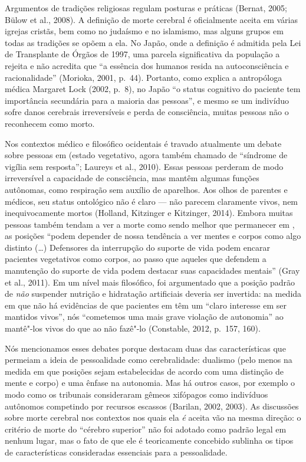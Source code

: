 Argumentos de tradições religiosas regulam posturas e práticas (Bernat,
2005; Bülow et al., 2008). A definição de morte cerebral é oficialmente
aceita em várias igrejas cristãs, bem como no judaísmo e no islamismo, mas
alguns grupos em todas as tradições se opõem a ela. No Japão, onde a
definição é admitida pela Lei de Transplante de Órgãos de 1997, uma
parcela significativa da população a rejeita e não acredita que ``a
essência dos humanos resida na autoconsciência e racionalidade''
(Morioka, 2001, p.~44). Portanto, como explica a antropóloga médica
Margaret Lock (2002, p.~8), no Japão ``o status cognitivo do paciente tem
importância secundária para a maioria das pessoas'', e mesmo se um
indivíduo sofre danos cerebrais irreversíveis e perda de consciência,
muitas pessoas não o reconhecem como morto.

Nos contextos médico e filosófico ocidentais é travado atualmente um
debate sobre pessoas em  (estado vegetativo, agora também chamado de
``síndrome de vigília sem resposta''; Laureys et al., 2010). Essas
pessoas perderam de modo irreversível a capacidade de consciência, mas
mantêm algumas funções autônomas, como respiração sem auxílio de
aparelhos. Aos olhos de parentes e médicos, seu status ontológico não é
claro --- não parecem claramente vivos, nem inequivocamente mortos
(Holland, Kitzinger e Kitzinger, 2014). Embora muitas pessoas também
tendam a ver a morte como sendo melhor que permanecer em , as
posições ``podem depender de nossa tendência a ver mentes e corpos como
algo distinto (\ldots{}) Defensores da interrupção do suporte de vida podem
encarar pacientes vegetativos como corpos, ao passo que aqueles que
defendem a manutenção do suporte de vida podem destacar suas capacidades
mentais'' (Gray et al., 2011). Em um nível mais filosófico, foi
argumentado que a posição padrão de \emph{não} suspender nutrição e
hidratação artificiais deveria ser invertida: na medida em que não há
evidências de que pacientes em  têm um ``claro interesse em ser
mantidos vivos'', nós ``cometemos uma mais grave violação de autonomia''
ao mantê"-los vivos do que ao não fazê"-lo (Constable, 2012, p.~157, 160).

Nós mencionamos esses debates porque destacam duas das características
que permeiam a ideia de pessoalidade como cerebralidade: dualismo (pelo
menos na medida em que posições sejam estabelecidas de acordo com uma
distinção de mente e corpo) e uma ênfase na autonomia. Mas há outros
casos, por exemplo o modo como os tribunais consideraram gêmeos
xifópagos como indivíduos autônomos competindo por recursos escassos
(Barilan, 2002, 2003). As discussões sobre morte cerebral nos contextos
nos quais ela \emph{é} aceita vão na mesma direção: o critério de morte
do ``cérebro superior'' não foi adotado como padrão legal em nenhum
lugar, mas o fato de que ele é teoricamente concebido sublinha os tipos
de características consideradas essenciais para a pessoalidade.

